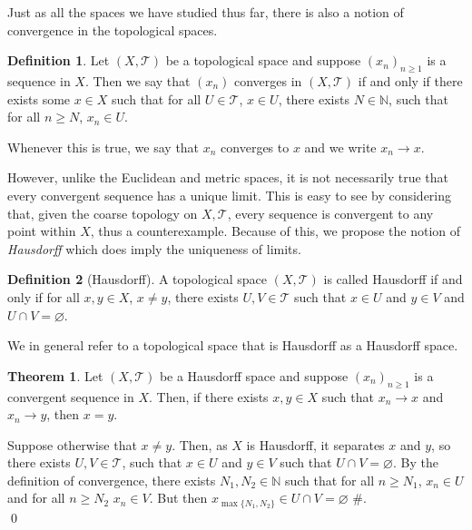 \documentclass[
]{article}
\theoremstyle{definition}
\newtheorem{theorem}{Theorem}
\theoremstyle{definition}
\newtheorem{definition}{Definition}[section]
\begin{document}
Just as all the spaces we have studied thus far, there is also a notion
of convergence in the topological spaces.

\begin{definition}
  Let \((X, \mathcal{T})\) be a topological space and suppose 
  \((x_n)_{n \ge 1}\) is a sequence in \(X\). Then we say that \((x_n)\) converges 
  in \((X, \mathcal{T})\) if and only if there exists some \(x \in X\) such 
  that for all \(U \in \mathcal{T}\), \(x \in U\), there exists \(N \in \mathbb{N}\), 
  such that for all \(n \ge N\), \(x_n \in U\).

  Whenever this is true, we say that \(x_n\) converges to \(x\) and we write 
  \(x_n \to x\).
\end{definition}

However, unlike the Euclidean and metric spaces, it is not necessarily
true that every convergent sequence has a unique limit. This is easy to
see by considering that, given the coarse topology on
\(X, \mathcal{T}\), every sequence is convergent to any point within
\(X\), thus a counterexample. Because of this, we propose the notion of
\emph{Hausdorff} which does imply the uniqueness of limits.

\begin{definition}[Hausdorff]
  A topological space \((X, \mathcal{T})\) is called Hausdorff if and only if 
  for all \(x, y \in X\), \(x \neq y\), there exists \(U, V \in \mathcal{T}\) 
  such that \(x \in U\) and \(y \in V\) and \(U \cap V = \varnothing\).
\end{definition}

We in general refer to a topological space that is Hausdorff as a
Hausdorff space.

\begin{theorem}
  Let \((X, \mathcal{T})\) be a Hausdorff space and suppose \((x_n)_{n \ge 1}\) 
  is a convergent sequence in \(X\). Then, if there exists \(x, y \in X\) such 
  that \(x_n \to x\) and \(x_n \to y\), then \(x = y\).
\end{theorem}
\proof

Suppose otherwise that \(x \neq y\). Then, as \(X\) is Hausdorff, it
separates \(x\) and \(y\), so there exists \(U, V \in \mathcal{T}\),
such that \(x \in U\) and \(y \in V\) such that
\(U \cap V = \varnothing\). By the definition of convergence, there
exists \(N_1, N_2 \in \mathbb{N}\) such that for all \(n \ge N_1\),
\(x_n \in U\) and for all \(n \ge N_2\) \(x_n \in V\). But then
\(x_{\max\{N_1, N_2\}} \in U \cap V = \varnothing\) \#.\\
\qed
\end{document}
